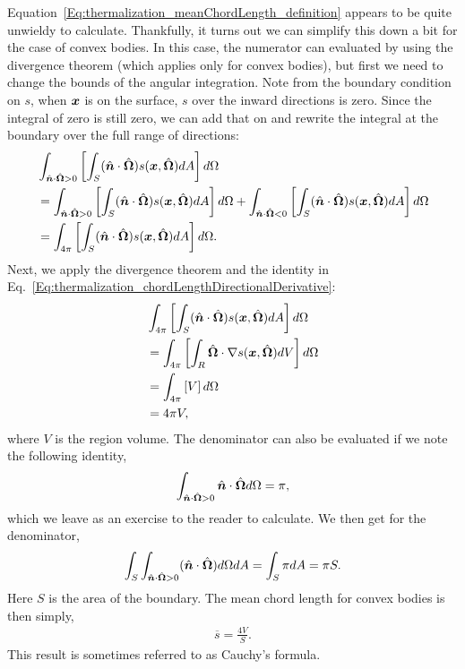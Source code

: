 Equation~\eqref{Eq:thermalization_meanChordLength_definition} appears to be quite unwieldy to calculate. Thankfully, it turns out we can simplify this down a bit for the case of convex bodies. In this case, the numerator can evaluated by using the divergence theorem (which applies only for convex bodies), but first we need to change the bounds of the angular integration. Note from the boundary condition on $s$, when $\bm{x}$ is on the surface, $s$ over the inward directions is zero. Since the integral of zero is still zero, we can add that on and rewrite the integral at the boundary over the full range of directions:
\begin{align}
  &\int_{\hat{\bm{n}} \cdot \hat{\mathbf{\Omega}} > 0} \left[ \displaystyle\int_{S} ( \hat{\bm{n}} \cdot \hat{\mathbf{\Omega}} ) s( \bm{x}, \hat{\mathbf{\Omega}} ) dA \right] d\Omega \nonumber \\
  &= \int_{\hat{\bm{n}} \cdot \hat{\mathbf{\Omega}} > 0} \left[ \displaystyle\int_{S} ( \hat{\bm{n}} \cdot \hat{\mathbf{\Omega}} ) s( \bm{x}, \hat{\mathbf{\Omega}} ) dA \right] d\Omega + \int_{\hat{\bm{n}} \cdot \hat{\mathbf{\Omega}} < 0} \left[ \displaystyle\int_{S} ( \hat{\bm{n}} \cdot \hat{\mathbf{\Omega}} ) s( \bm{x}, \hat{\mathbf{\Omega}} ) dA \right] d\Omega \nonumber \\
  &= \int_{4\pi} \left[ \displaystyle\int_{S} ( \hat{\bm{n}} \cdot \hat{\mathbf{\Omega}} ) s( \bm{x}, \hat{\mathbf{\Omega}} ) dA \right] d\Omega . \nonumber 
\end{align}
Next, we apply the divergence theorem and the identity in Eq.~\eqref{Eq:thermalization_chordLengthDirectionalDerivative}:
\begin{align}
  &\int_{4\pi} \left[ \displaystyle\int_{S} ( \hat{\bm{n}} \cdot \hat{\mathbf{\Omega}} ) s( \bm{x}, \hat{\mathbf{\Omega}} ) dA \right] d\Omega \nonumber \\
  &= \int_{{4\pi}} \left[ \displaystyle\int_{R} \hat{\mathbf{\Omega}} \cdot \nabla s( \bm{x}, \hat{\mathbf{\Omega}} ) dV \right] d\Omega \nonumber \\
  &= \int_{{4\pi}} \left[ V \right] d\Omega \nonumber \\
  &= 4\pi V , \label{Eq:thermalization_meanChordLengthNumerator}
\end{align}
where $V$ is the region volume. The denominator can also be evaluated if we note the following identity,
\begin{align}
  \int_{\hat{\bm{n}} \cdot \hat{\mathbf{\Omega}} > 0} \hat{\bm{n}} \cdot \hat{\mathbf{\Omega}} d\Omega = \pi ,
\end{align}
which we leave as an exercise to the reader to calculate. We then get for the denominator,
\begin{align}
  \displaystyle\int_{S} \int_{\hat{\bm{n}} \cdot \hat{\mathbf{\Omega}} > 0} ( \hat{\bm{n}} \cdot \hat{\mathbf{\Omega}} ) d\Omega dA = \displaystyle\int_{S} \pi dA = \pi S.
\end{align}
Here $S$ is the area of the boundary. The mean chord length for convex bodies is then simply,
\begin{align}
  \overline{s} = \frac{ 4 V }{ S }. \label{Eq:thermalization_meanChordLength_convexBody}
\end{align}
This result is sometimes referred to as Cauchy's formula.

